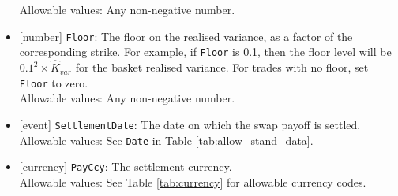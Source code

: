 \begin{itemize}
  Allowable values: Any non-negative number.
  \item{}[number] \lstinline!Floor!: The floor on the realised variance, as a factor of the corresponding strike. For example,
  if \lstinline!Floor! is 0.1, then the floor level will be $0.1^2 \times \hat{K}_{var}$ for the basket realised variance.
  For trades with no floor, set \lstinline!Floor! to zero. \\
  Allowable values: Any non-negative number.
  \item{}[event] \lstinline!SettlementDate!: The date on which the swap payoff is settled. \\
  Allowable values: See \lstinline!Date! in Table \ref{tab:allow_stand_data}.
  \item{}[currency] \lstinline!PayCcy!: The settlement currency. \\
  Allowable values: See Table \ref{tab:currency} for allowable currency codes.
\end{itemize}